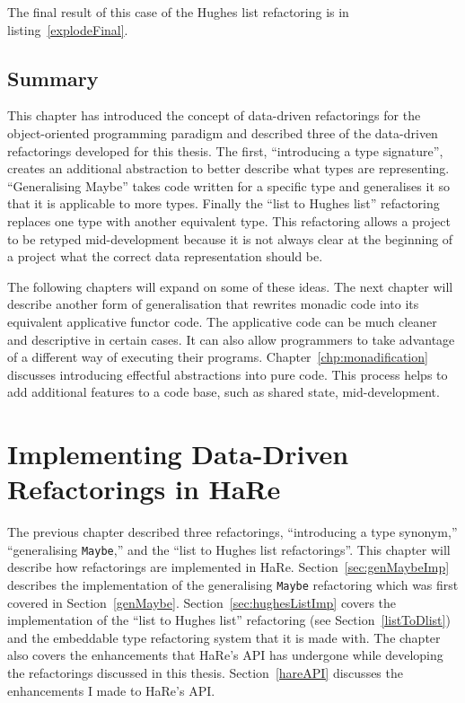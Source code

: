 The final result of this case of the Hughes list refactoring is in listing~\ref{explodeFinal}.

\section{Summary}

This chapter has introduced the concept of data-driven refactorings for the object-oriented programming paradigm and described three of the data-driven refactorings developed for this thesis. The first, ``introducing a type signature'', creates an additional abstraction to better describe what types are representing. ``Generalising Maybe'' takes code written for a specific type and generalises it so that it is applicable to more types. Finally the ``list to Hughes list'' refactoring replaces one type with another equivalent type. This refactoring allows a project to be retyped mid-development because it is not always clear at the beginning of a project what the correct data representation should be.

The following chapters will expand on some of these ideas. The next chapter will describe another form of generalisation that rewrites monadic code into its equivalent applicative functor code. The applicative code can be much cleaner and descriptive in certain cases. It can also allow programmers to take advantage of a different way of executing their programs. Chapter~\ref{chp:monadification} discusses introducing effectful abstractions into pure code. This process helps to add additional features to a code base, such as shared state, mid-development.

\chapter{Implementing Data-Driven Refactorings in HaRe}
\label{chp:generalImp}

\renewcommand{\topfraction}{1}
\renewcommand{\floatpagefraction}{1}

The previous chapter described three refactorings, ``introducing a type synonym,'' ``generalising \texttt{Maybe},'' and the ``list to Hughes list refactorings''. This chapter will describe how refactorings are implemented in HaRe. Section~\ref{sec:genMaybeImp} describes the implementation of the generalising \texttt{Maybe} refactoring which was first covered in Section~\ref{genMaybe}. Section~\ref{sec:hughesListImp} covers the implementation of the ``list to Hughes list'' refactoring (see Section~\ref{listToDlist}) and the embeddable type refactoring system that it is made with. The chapter also covers the enhancements that HaRe's API has undergone while developing the refactorings discussed in this thesis. Section~\ref{hareAPI} discusses the enhancements I made to HaRe's API.

